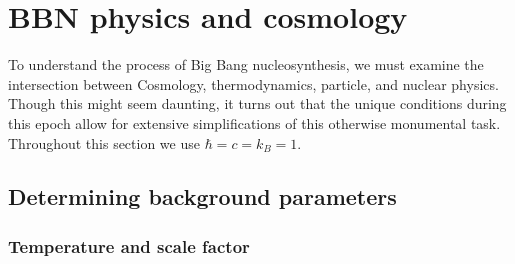 
\chapter{BBN physics and cosmology}
\label{chap:theory}

To understand the process of Big Bang nucleosynthesis, we must examine the intersection between Cosmology, thermodynamics, particle, and nuclear physics. Though this might seem daunting, it turns out that the unique conditions during this epoch allow for extensive simplifications of this otherwise monumental task. Throughout this section we use $\hbar=c=k_B=1$.



\section{Determining background parameters}
\label{sec:Background}

\subsection{Temperature and scale factor}
\label{ssec:cosmology}

